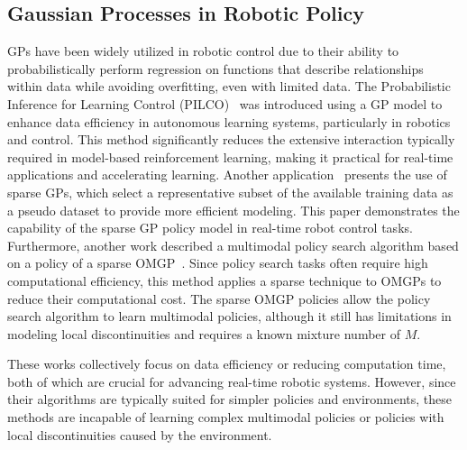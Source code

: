 \subsection{Gaussian Processes in Robotic Policy}
GPs have been widely utilized in robotic control due to their ability to probabilistically perform regression on functions that describe relationships within data while avoiding overfitting, even with limited data.
The Probabilistic Inference for Learning Control (PILCO)~\cite{deisenroth2013gaussian} was introduced using a GP model to enhance data efficiency in autonomous learning systems, particularly in robotics and control.
This method significantly reduces the extensive interaction typically required in model-based reinforcement learning, making it practical for real-time applications and accelerating learning.
Another application~\cite{schreiter2015sparse} presents the use of sparse GPs, which select a representative subset of the available training data as a pseudo dataset to provide more efficient modeling. This paper demonstrates the capability of the sparse GP policy model in real-time robot control tasks. 
Furthermore, another work described a multimodal policy search algorithm based on a policy of a sparse OMGP~\cite{sasaki2021variational}. Since policy search tasks often require high computational efficiency, this method applies a sparse technique to OMGPs to reduce their computational cost. The sparse OMGP policies allow the policy search algorithm to learn multimodal policies, although it still has limitations in modeling local discontinuities and requires a known mixture number of $M$.


These works collectively focus on data efficiency or reducing computation time, both of which are crucial for advancing real-time robotic systems.
However, since their algorithms are typically suited for simpler policies and environments, these methods are incapable of learning complex multimodal policies or policies with local discontinuities caused by the environment.



